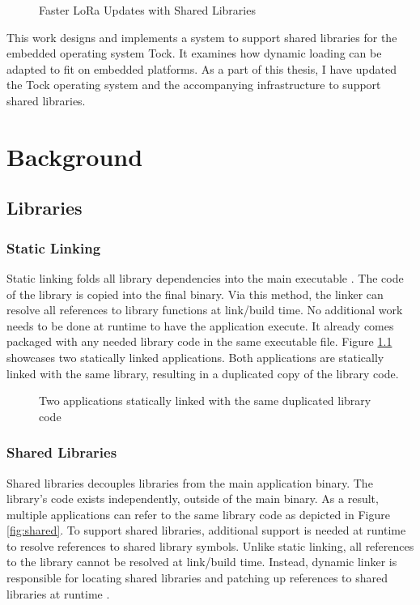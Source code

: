 \documentclass[12pt]{ucsddissertation}
\begin{document}
\begin{dissertationintroduction}
\begin{figure}
\centering

\caption{Faster LoRa Updates with Shared Libraries}
\label{fig:lora}
\end{figure}

This work designs and implements a system to support shared libraries for the embedded operating system Tock. It examines how dynamic loading can be adapted to fit on embedded platforms. As a part of this thesis, I have updated the Tock operating system and the accompanying infrastructure to support shared libraries.

\end{dissertationintroduction}

\chapter{Background}

\section{Libraries}
\subsection{Static Linking}
Static linking folds all library dependencies into the main executable \cite{systems}. The code of the library is copied into the final binary. Via this method, the linker can resolve all references to library functions at link/build time. No additional work needs to be done at runtime to have the application execute. It already comes packaged with any needed library code in the same executable file. Figure \ref{fig:static} showcases two statically linked applications. Both applications are statically linked with the same library, resulting in a duplicated copy of the library code.

\begin{figure}[h!]
\centering

\caption[Static Libraries]{Two applications statically linked with the same duplicated library code}
\label{fig:static}
\end{figure}

\subsection{Shared Libraries}
Shared libraries decouples libraries from the main application binary. The library's code exists independently, outside of the main binary. As a result, multiple applications can refer to the same library code as depicted in Figure \ref{fig:shared}. To support shared libraries, additional support is needed at runtime to resolve references to shared library symbols. Unlike static linking, all references to the library cannot be resolved at link/build time. Instead, dynamic linker is responsible for locating shared libraries and patching up references to shared libraries at runtime \cite{lwm-dynamic}. 
\end{document}
